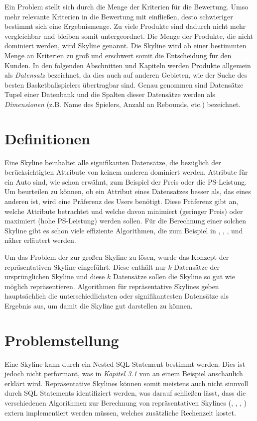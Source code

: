 Ein Problem stellt sich durch die Menge der Kriterien für die Bewertung. Umso mehr relevante Kriterien in die Bewertung mit einfließen, desto schwieriger bestimmt sich eine Ergebnismenge. Zu viele Produkte sind dadurch nicht mehr vergleichbar und bleiben somit untergeordnet. Die Menge der Produkte, die nicht dominiert werden, wird Skyline genannt. Die Skyline wird ab einer bestimmten Menge an Kriterien zu groß und  erschwert somit die Entscheidung für den Kunden. 
In den folgenden Abschnitten und Kapiteln werden Produkte allgemein als \textit{Datensatz} bezeichnet, da dies auch auf anderen Gebieten, wie der Suche des besten Basketballspielers übertragbar sind.
Genau genommen sind Datensätze Tupel einer Datenbank und die Spalten dieser Datensätze werden als \textit{Dimensionen} (z.B. Name des Spielers, Anzahl an Rebounds, etc.) bezeichnet.
\section{Definitionen}
\label{ch:Einleitung:sec:Definitionen}
Eine Skyline beinhaltet alle signifikanten Datensätze, die bezüglich der berücksichtigten Attribute von keinem anderen dominiert werden. Attribute für ein Auto sind, wie schon erwähnt, zum Beispiel der Preis oder die PS-Leistung. Um beurteilen zu können, ob ein Attribut eines Datensatzes besser als, das eines anderen ist, wird eine Präferenz des Users benötigt. Diese Präferenz gibt an, welche Attribute betrachtet und welche davon minimiert (geringer Preis) oder maximiert (hohe PS-Leistung) werden sollen. Für die Berechnung einer solchen Skyline gibt es schon viele effiziente Algorithmen, die zum Beispiel in \cite{borzsony2001skyline}, \cite{Chan:2006:HDS:2117976.2118017}, \cite{Kossmann:2002:SSS:1287369.1287394}, \cite{Papadias:2003:OPA:872757.872814} und \cite{Tan:2001:EPS:645927.672217} näher erläutert werden.

Um das Problem der zur großen Skyline zu lösen, wurde das Konzept der repräsentativen Skyline eingeführt. Diese enthält nur $k$ Datensätze der ursprünglichen Skyline und diese $k$ Datensätze sollen die Skyline so gut wie möglich repräsentieren. Algorithmen für repräsentative Skylines geben hauptsächlich die unterschiedlichsten oder signifikantesten Datensätze als Ergebnis aus, um damit die Skyline gut darstellen zu können. 
\section{Problemstellung}
\label{ch:Einleitung:sec:Problemstellung}
Eine Skyline kann durch ein Nested SQL Statement bestimmt werden. Dies ist jedoch nicht performant, was in \textit{Kapitel 3.1} von \cite{borzsony2001skyline} an einem Beispiel anschaulich erklärt wird. Repräsentative Skylines können somit meistens auch nicht sinnvoll durch SQL Statements identifiziert werden, was darauf schließen lässt, dass die verschiedenen Algorithmen zur Berechnung von repräsentativen Skylines (\cite{Tao:2009:DRS:1546683.1547325}, \cite{cai2015efficient}, \cite{magnani2014taking}, \cite{4221657}) extern implementiert werden müssen, welches zusätzliche Rechenzeit kostet.

